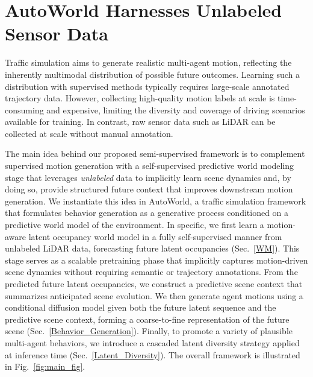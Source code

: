\documentclass[runningheads]{llncs}
\begin{document}
\vspace{-1mm}


\section{AutoWorld Harnesses Unlabeled Sensor Data} 

Traffic simulation aims to generate realistic multi-agent motion, reflecting the inherently multimodal distribution of possible future outcomes. Learning such a distribution with supervised methods typically requires large-scale annotated trajectory data. However, collecting high-quality motion labels at scale is time-consuming and expensive, limiting the diversity and coverage of driving scenarios available for training. In contrast, raw sensor data such as LiDAR can be collected at scale without manual annotation.

The main idea behind our proposed semi-supervised framework is to complement supervised motion generation with a self-supervised predictive world modeling stage that leverages \textit{unlabeled} data to implicitly learn scene dynamics and, by doing so, provide structured future context that improves downstream motion generation. We instantiate this idea in AutoWorld, a traffic simulation framework that formulates behavior generation as a generative process conditioned on a predictive world model of the environment. In specific, we first learn a motion-aware latent occupancy world model in a fully self-supervised manner from unlabeled LiDAR data, forecasting future latent occupancies (Sec.~\ref{WM}). This stage serves as a scalable pretraining phase that implicitly captures motion-driven scene dynamics without requiring semantic or trajectory annotations. From the predicted future latent occupancies, we construct a predictive scene context that summarizes anticipated scene evolution. We then generate agent motions using a conditional diffusion model given both the future latent sequence and the predictive scene context, forming a coarse-to-fine representation of the future scene (Sec.~\ref{Behavior_Generation}). Finally, to promote a variety of plausible multi-agent behaviors, we introduce a cascaded latent diversity strategy applied at inference time (Sec.~\ref{Latent_Diversity}). The overall framework is illustrated in Fig.~\ref{fig:main_fig}.

\vspace{-1mm}
\end{document}
